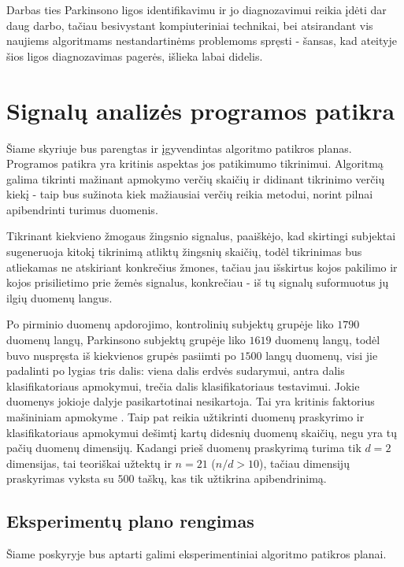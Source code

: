 \documentclass[]{vgtuef}
\begin{document}
Darbas ties Parkinsono ligos identifikavimu ir jo diagnozavimui reikia įdėti dar daug darbo, tačiau besivystant kompiuteriniai technikai, bei atsirandant vis naujiems algoritmams nestandartinėms problemoms spręsti - šansas, kad ateityje šios ligos diagnozavimas pagerės, išlieka labai didelis.

\section{Signalų analizės programos patikra}

Šiame skyriuje bus parengtas ir įgyvendintas algoritmo patikros planas. Programos patikra yra kritinis aspektas jos patikimumo tikrinimui. Algoritmą galima tikrinti mažinant apmokymo verčių skaičių ir didinant tikrinimo verčių kiekį - taip bus sužinota kiek mažiausiai verčių reikia metodui, norint pilnai apibendrinti turimus duomenis.

Tikrinant kiekvieno žmogaus žingsnio signalus, paaiškėjo, kad skirtingi subjektai sugeneruoja kitokį tikrinimą atliktų žingsnių skaičių, todėl tikrinimas bus atliekamas ne atskiriant konkrečius žmones, tačiau jau išskirtus kojos pakilimo ir kojos prisilietimo prie žemės signalus, konkrečiau - iš tų signalų suformuotus jų ilgių duomenų langus.

Po pirminio duomenų apdorojimo, kontrolinių subjektų grupėje liko $1790$ duomenų langų, Parkinsono subjektų grupėje liko $1619$ duomenų langų, todėl buvo nuspręsta iš kiekvienos grupės pasiimti po $1500$ langų duomenų, visi jie padalinti po lygias tris dalis: viena dalis erdvės sudarymui, antra dalis klasifikatoriaus apmokymui, trečia dalis klasifikatoriaus testavimui. Jokie duomenys jokioje dalyje pasikartotinai nesikartoja. Tai yra kritinis faktorius mašininiam apmokyme \cite{824819}. Taip pat reikia užtikrinti duomenų praskyrimo ir klasifikatoriaus apmokymui dešimtį kartų didesnių duomenų skaičių, negu yra tų pačių duomenų dimensijų. Kadangi prieš duomenų praskyrimą turima tik $d=2$ dimensijas, tai teoriškai užtektų ir $n=21$ ($n/d > 10$), tačiau dimensijų praskyrimas vyksta su $500$ taškų, kas tik užtikrina apibendrinimą. 

\subsection{Eksperimentų plano rengimas}

Šiame poskyryje bus aptarti galimi eksperimentiniai algoritmo patikros planai.
\end{document}
